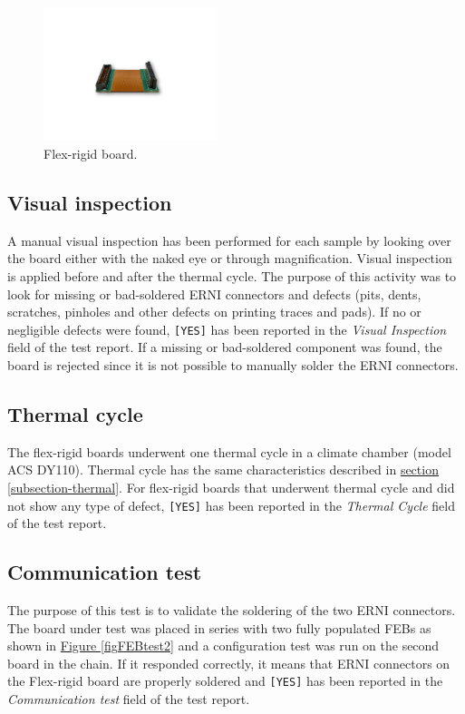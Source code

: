 \begin{figure}[h!]
    \centering
    \includegraphics[width=0.45\textwidth]{Images/chap2/flex_rigid_pic.pdf}
    \caption{Flex-rigid board.}
    \label{figDflexrigidPIC}
\end{figure}

\subsection{Visual inspection}
A manual visual inspection has been performed for each sample by looking over the board either with the naked eye or through magnification. Visual inspection is applied before and after the thermal cycle. The purpose of this activity was to look for missing or bad-soldered ERNI connectors and defects (pits, dents, scratches, pinholes and other defects on printing traces and pads). If no or negligible defects were found, \texttt{[YES]} has been reported in the \textit{Visual Inspection} field of the test report. If a missing or bad-soldered component was found, the board is rejected since it is not possible to manually solder the ERNI connectors.

\subsection{Thermal cycle}
The flex-rigid boards underwent one thermal cycle in a climate chamber (model ACS DY110). Thermal cycle has the same characteristics described in \hyperref[subsection-thermal]{section \ref{subsection-thermal}}. For flex-rigid boards that underwent thermal cycle and did not show any type of defect, \texttt{[YES]} has been reported in the \textit{Thermal Cycle} field of the test report.

\subsection{Communication test}
The purpose of this test is to validate the soldering of the two ERNI connectors. The board under test was placed in series with two fully populated FEBs as shown in \hyperref[figFEBtest2]{Figure \ref{figFEBtest2}} and a configuration test was run on the second board in the chain. If it responded correctly, it means that ERNI connectors on the Flex-rigid board are properly soldered and \texttt{[YES]} has been reported in the \textit{Communication test} field of the test report. \\

